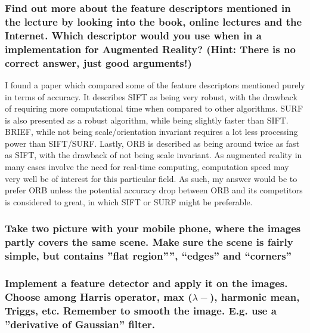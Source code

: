 \documentclass[a4paper, titlepage,12pt]{article}
\begin{document}
	\subsubsection*{Find out more about the feature descriptors mentioned in the lecture 
by looking into the book, online lectures and the Internet.  Which 
descriptor would you use when in a implementation for Augmented 
Reality? (Hint: There is no correct answer, just good arguments!)}

	I found a paper which compared some of the feature descriptors mentioned purely in terms of accuracy\cite{feat-comp}. It describes SIFT as being very robust, with the drawback of requiring more computational time when compared to other algorithms. SURF is also presented as a robust algorithm, while being slightly faster than SIFT. BRIEF, while not being scale/orientation invariant requires a lot less processing power than SIFT/SURF. Lastly, ORB is described as being around twice as fast as SIFT, with the drawback of not being scale invariant. As augmented reality in many cases involve the need for real-time computing, computation speed may very well be of interest for this particular field. As such, my answer would be to prefer ORB unless the potential accuracy drop between ORB and its competitors is considered to great, in which SIFT or SURF might be preferable.

	\subsubsection*{Take two picture with your mobile phone, where the images partly 
covers the same scene. Make sure the scene is fairly simple, but 
contains ''flat region''”, “edges” and “corners”}

	\subsubsection*{Implement a feature detector and apply it on the images. Choose among Harris operator, max ($\lambda-$), harmonic mean, Triggs, etc. Remember to smooth the image. E.g. use a ''derivative of Gaussian'' filter.}
\end{document}
